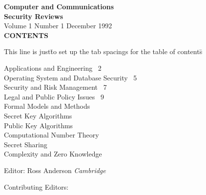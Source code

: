 \parskip 12pt

%
%            
 


\begin{center}
{\bf \Huge Computer and Communications\\
Security Reviews\\}
\vspace{5.0ex}
Volume 1 Number 1 December 1992\\

\vspace{7.0ex}
{\bf CONTENTS}
\end{center}

\begin{tabbing}
This line is just\=to set up the tab spacings for the table of contents\= \kill

\>Applications and Engineering \>~2\\
\>Operating System and Database Security \>~5\\
\>Security and Risk Management \>~7\\
\>Legal and Public Policy Issues \>~9\\
\>Formal Models and Methods \\
\>Secret Key Algorithms \\
\>Public Key Algorithms \\
\>Computational Number Theory \\
\>Secret Sharing \\
\>Complexity and Zero Knowledge \\

\end{tabbing}
\begin{center}
\vspace{3.0ex}
Editor: Ross Anderson {\em Cambridge}

\vspace{3.0ex}
Contributing Editors:\\
\end{center}

